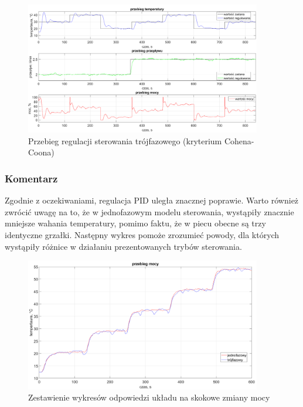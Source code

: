 \documentclass[a4paper,twoside,12pt]{book}
\begin{document}
\newpage
\begin{figure}[h]
	\centering
	\includegraphics[width=0.92\textwidth]{./wykresy/png/regulation(CohenCoon)ThreePhase.png}
	\caption{Przebieg regulacji sterowania trójfazowego (kryterium Cohena-Coona)}
	\label{fig:Cohen Coon trójfazowy}
\end{figure}

\subsubsection{Komentarz}
Zgodnie z oczekiwaniami, regulacja PID uległa znacznej poprawie. Warto również zwrócić uwagę na to, że w jednofazowym modelu sterowania, wystąpiły znacznie mniejsze wahania temperatury, pomimo faktu, że w piecu obecne są trzy identyczne grzałki. Następny wykres pomoże zrozumieć powody, dla których wystąpiły różnice w działaniu prezentowanych trybów sterowania.

\begin{figure}[h]
	\centering
	\includegraphics[width=0.92\textwidth]{./wykresy/png/stepCompare.png}
	\caption{Zestawienie wykresów odpowiedzi układu na skokowe zmiany mocy}
	\label{fig:Wykresy mocy}
\end{figure}
\end{document}
